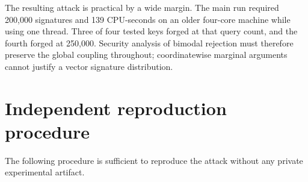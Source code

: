 \documentclass[11pt,a4paper]{article}
\begin{document}
The resulting attack is practical by a wide margin.  The main run required
200,000 signatures and 139 CPU-seconds on an older four-core machine while
using one thread.  Three of four tested keys forged at that query count, and
the fourth forged at 250,000.  Security analysis of bimodal rejection must
therefore preserve the global coupling throughout; coordinatewise marginal
arguments cannot justify a vector signature distribution.

\appendix
\section{Independent reproduction procedure}

The following procedure is sufficient to reproduce the attack without any
private experimental artifact.
\end{document}
